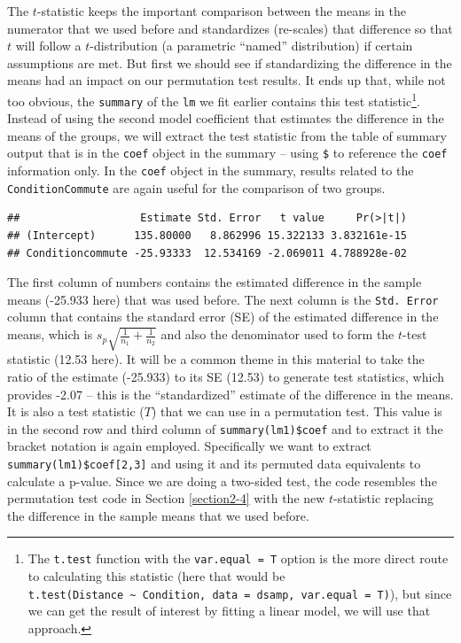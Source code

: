 \documentclass[
]{book}
\newenvironment{Shaded}{\begin{snugshade}}{\end{snugshade}}
\newcommand{\FunctionTok}[1]{\textcolor[rgb]{0.00,0.00,0.00}{#1}}
\newcommand{\NormalTok}[1]{#1}
\newcommand{\SpecialCharTok}[1]{\textcolor[rgb]{0.00,0.00,0.00}{#1}}
\begin{document}
The \(t\)-statistic keeps the important comparison between the means in the
numerator that we used before and standardizes (re-scales) that difference so
that \(t\) will follow a \(t\)-distribution
(a parametric
``named'' distribution) if
certain assumptions are met. But first we should see if standardizing the
difference in the means had an impact on our permutation test
results. It ends up that, while not too obvious, the \texttt{summary} of the \texttt{lm} we fit earlier contains this test statistic\footnote{The \texttt{t.test} function with the \texttt{var.equal\ =\ T} option is the more direct route to calculating this statistic (here that would be \texttt{t.test(Distance\ \textasciitilde{}\ Condition,\ data\ =\ dsamp,\ var.equal\ =\ T)}), but since we can get the result of interest by fitting a linear model, we will use that approach.}. Instead
of using the second model coefficient that estimates the difference in the means of the groups, we will extract the test statistic from the table of summary output that is in the \texttt{coef} object in the summary -- using \texttt{\$} to reference the \texttt{coef} information only. In the \texttt{coef} object in the summary, results related to the \texttt{ConditionCommute} are again useful for the comparison of two groups.

\begin{Shaded}
\end{Shaded}

\begin{verbatim}
##                   Estimate Std. Error   t value     Pr(>|t|)
## (Intercept)      135.80000   8.862996 15.322133 3.832161e-15
## Conditioncommute -25.93333  12.534169 -2.069011 4.788928e-02
\end{verbatim}

The first column of numbers contains the estimated difference in the sample means (-25.933 here) that was used before. The next column is the \texttt{Std.\ Error} column that contains the standard error (SE) of the estimated difference in the means, which is \(s_p\sqrt{\frac{1}{n_1}+\frac{1}{n_2}}\) and also the denominator used to form the \(t\)-test statistic (12.53 here). It will be a common theme in this material to take the ratio of the estimate (-25.933) to its SE (12.53) to generate test statistics, which provides -2.07 -- this is the ``standardized'' estimate of the difference in the means. It is also a test statistic (\(T\)) that we can use in a permutation test. This value is in the second row and third column of \texttt{summary(lm1)\$coef} and to extract it the bracket notation is again employed. Specifically we want to extract \texttt{summary(lm1)\$coef{[}2,3{]}} and using it and its permuted data equivalents to calculate a p-value. Since we are doing a two-sided
test, the code resembles the permutation test code in Section \ref{section2-4}
with the new \(t\)-statistic replacing the difference in the sample means that we
used before.
\end{document}
